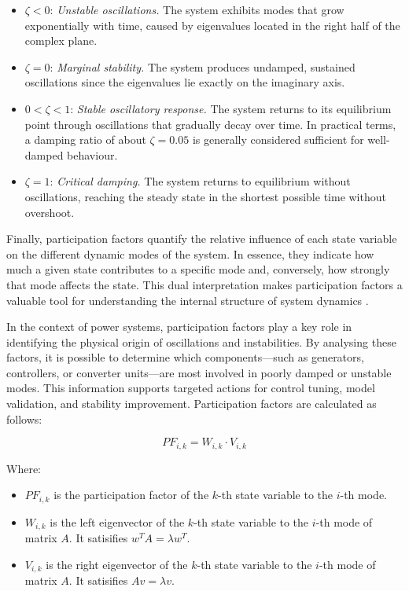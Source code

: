 \begin{itemize}
  \item $\zeta < 0$: \textit{Unstable oscillations.} The system exhibits modes that grow exponentially with time, caused by eigenvalues located in the right half of the complex plane.
  \item $\zeta = 0$: \textit{Marginal stability.} The system produces undamped, sustained oscillations since the eigenvalues lie exactly on the imaginary axis.
  \item $0 < \zeta < 1$: \textit{Stable oscillatory response.} The system returns to its equilibrium point through oscillations that gradually decay over time. In practical terms, a damping ratio of about $\zeta = 0.05$ is generally considered sufficient for well-damped behaviour.
  \item $\zeta = 1$: \textit{Critical damping.} The system returns to equilibrium without oscillations, reaching the steady state in the shortest possible time without overshoot.
\end{itemize}

Finally, participation factors quantify the relative influence of each state variable on the different dynamic modes of the system. In essence,
they indicate how much a given state contributes to a specific mode and, conversely, how strongly that mode affects the state.
This dual interpretation makes participation factors a valuable tool for understanding the internal structure of system dynamics \cite{KonovaPF}.

In the context of power systems, participation factors play a key role in identifying the physical origin of oscillations and instabilities.
By analysing these factors, it is possible to determine which components—such as generators, controllers, or converter units—are most involved in poorly damped or unstable modes.
This information supports targeted actions for control tuning, model validation, and stability improvement. Participation factors are calculated as follows:

\begin{equation}
PF_{i,k} = W_{i,k} \cdot V_{i,k}
\end{equation}

Where:
\begin{itemize}
  \item $PF_{i,k}$ is the participation factor of the $k$-th state variable to the $i$-th mode.
  \item $W_{i,k}$ is the left eigenvector of the $k$-th state variable to the $i$-th mode of matrix $A$. It satisifies $w^T A = \lambda w^T$.
  \item $V_{i,k}$ is the right eigenvector of the $k$-th state variable to the $i$-th mode of matrix $A$. It satisifies $A v= \lambda v$.
\end{itemize}

